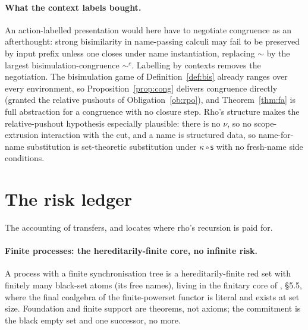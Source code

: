 \documentclass[11pt]{article}
\newcommand{\swp}{\mathsf{s}}                  %
\newcommand{\kt}{\kappa}                       %
\newcommand{\bis}{\sim}
\theoremstyle{plain}
\theoremstyle{definition}
\begin{document}
\paragraph{What the context labels bought.} An action-labelled presentation would
here have to negotiate congruence as an afterthought: strong bisimilarity in
name-passing calculi may fail to be preserved by input prefix unless one closes
under name instantiation, replacing $\bis$ by the largest bisimulation-congruence
$\bis^{c}$. Labelling by contexts removes the negotiation. The bisimulation game of
Definition~\ref{def:bis} already ranges over every environment, so
Proposition~\ref{prop:cong} delivers congruence directly (granted the relative
pushouts of Obligation~\ref{ob:rpo}), and Theorem~\ref{thm:fa} is full abstraction
for a congruence with no closure step. Rho's structure makes the relative-pushout
hypothesis especially plausible: there is no $\nu$, so no scope-extrusion
interaction with the cut, and a name is structured data, so name-for-name
substitution is set-theoretic substitution under $\kt\circ\swp$ with no fresh-name
side conditions.

\section{The risk ledger}\label{sec:ledger}

The accounting of \cite{knot} transfers, and locates where rho's recursion is paid
for.

\paragraph{Finite processes: the hereditarily-finite core, no infinite risk.}
A process with a finite synchronisation tree is a hereditarily-finite red set with
finitely many black-set atoms (its free names), living in the finitary core of
\cite{knot}, \S5.5, where the final coalgebra of the finite-powerset functor is
literal and exists at set size. Foundation and finite support are theorems, not
axioms; the commitment is the black empty set and one successor, no more.
\end{document}
